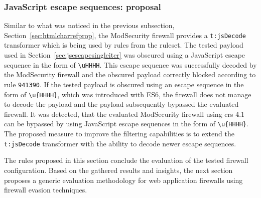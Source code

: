 \subsubsection{JavaScript escape sequences: proposal}
\label{sec:jsescprop}
Similar to what was noticed in the previous subsection, Section~\ref{sec:htmlcharrefprop}, the ModSecurity firewall provides a \verb|t:jsDecode| transformer which is being used by rules from the ruleset. The tested payload used in Section~\ref{sec:jsescapesingleiter} was obscured using a JavaScript escape sequence in the form of \verb|\uHHHH|. This escape sequence was successfully decoded by the ModSecurity firewall and the obscured payload correctly blocked according to rule \verb|941390|. If the tested payload is obscured using an escape sequence in the form of \verb|\u{HHHH}|, which was introduced with ES6, the firewall does not manage to decode the payload and the payload subsequently bypassed the evaluated firewall. It was detected, that the evaluated ModSecurity firewall using \acrshort{crs} 4.1 can be bypassed by using JavaScript escape sequences in the form of \verb|\u{HHHH}|. The proposed measure to improve the filtering capabilities is to extend the \verb|t:jsDecode| transformer with the ability to decode newer escape sequences.

\bigskip
The rules proposed in this section conclude the evaluation of the tested firewall configuration. Based on the gathered results and insights, the next section proposes a generic evaluation methodology for web application firewalls using firewall evasion techniques.

